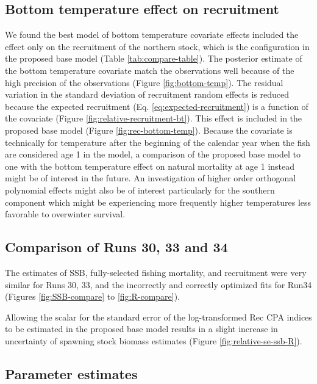 \documentclass[
]{article}
\begin{document}
\hypertarget{bottom-temperature-effect-on-recruitment}{%
\subsection{Bottom temperature effect on recruitment}\label{bottom-temperature-effect-on-recruitment}}

We found the best model of bottom temperature covariate effects included the effect only on the recruitment of the northern stock, which is the configuration in the proposed base model (Table \ref{tab:compare-table}). The posterior estimate of the bottom temperature covariate match the observations well because of the high precision of the observations (Figure \ref{fig:bottom-temp}). The residual variation in the standard deviation of recruitment random effects is reduced because the expected recruitment (Eq. \ref{eq:expected-recruitment}) is a function of the covariate (Figure \ref{fig:relative-recruitment-bt}). This effect is included in the proposed base model (Figure \ref{fig:rec-bottom-temp}). Because the covariate is technically for temperature after the beginning of the calendar year when the fish are considered age 1 in the model, a comparison of the proposed base model to one with the bottom temperature effect on natural mortality at age 1 instead might be of interest in the future. An investigation of higher order orthogonal polynomial effects might also be of interest particularly for the southern component which might be experiencing more frequently higher temperatures less favorable to overwinter survival.

\hypertarget{comparison-of-runs-30-33-and-34}{%
\subsection{Comparison of Runs 30, 33 and 34}\label{comparison-of-runs-30-33-and-34}}

The estimates of SSB, fully-selected fishing mortality, and recruitment were very similar for Runs 30, 33, and the incorrectly and correctly optimized fits for Run34 (Figures \ref{fig:SSB-compare} to \ref{fig:R-compare}).

Allowing the scalar for the standard error of the log-transformed Rec CPA indices to be estimated in the proposed base model results in a slight increase in uncertainty of spawning stock biomass estimates (Figure \ref{fig:relative-se-ssb-R}).

\hypertarget{parameter-estimates}{%
\subsection{Parameter estimates}\label{parameter-estimates}}
\end{document}
